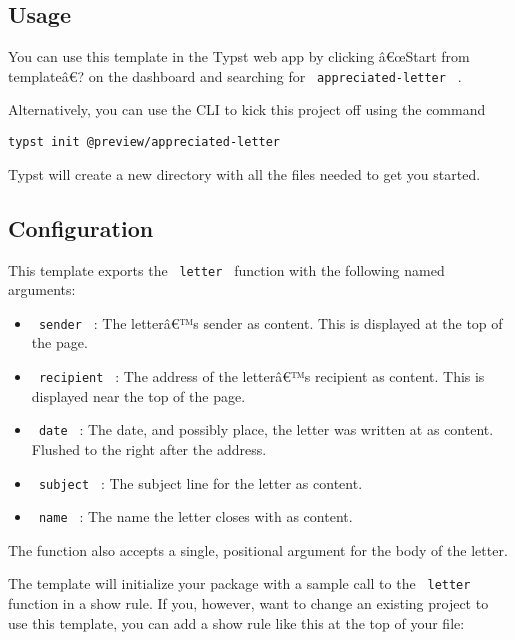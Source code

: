 \subsection{Usage}\label{usage}

You can use this template in the Typst web app by clicking â€œStart from
templateâ€? on the dashboard and searching for
\texttt{\ appreciated-letter\ } .

Alternatively, you can use the CLI to kick this project off using the
command

\begin{verbatim}
typst init @preview/appreciated-letter
\end{verbatim}

Typst will create a new directory with all the files needed to get you
started.

\subsection{Configuration}\label{configuration}

This template exports the \texttt{\ letter\ } function with the
following named arguments:

\begin{itemize}
\tightlist
\item
  \texttt{\ sender\ } : The letterâ€™s sender as content. This is
  displayed at the top of the page.
\item
  \texttt{\ recipient\ } : The address of the letterâ€™s recipient as
  content. This is displayed near the top of the page.
\item
  \texttt{\ date\ } : The date, and possibly place, the letter was
  written at as content. Flushed to the right after the address.
\item
  \texttt{\ subject\ } : The subject line for the letter as content.
\item
  \texttt{\ name\ } : The name the letter closes with as content.
\end{itemize}

The function also accepts a single, positional argument for the body of
the letter.

The template will initialize your package with a sample call to the
\texttt{\ letter\ } function in a show rule. If you, however, want to
change an existing project to use this template, you can add a show rule
like this at the top of your file:

